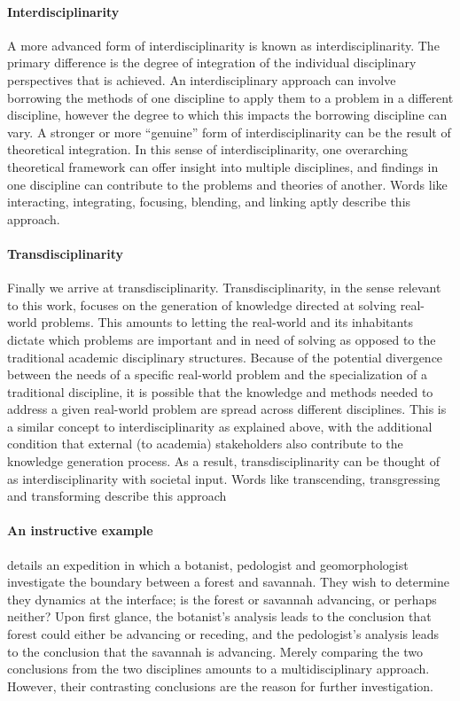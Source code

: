 \documentclass[a4paper]{article}
\begin{document}
\paragraph{Interdisciplinarity}

A more advanced form of interdisciplinarity is known as interdisciplinarity.
The primary difference is the degree of integration of the individual
disciplinary perspectives that is achieved. An interdisciplinary approach can
involve borrowing the methods of one discipline to apply them to a problem in
a different discipline, however the degree to which this impacts the borrowing
discipline can vary. A stronger or more ``genuine'' form of
interdisciplinarity can be the result of theoretical integration. In this
sense of interdisciplinarity, one overarching theoretical framework can offer
insight into multiple disciplines, and findings in one discipline can
contribute to the problems and theories of another. Words like interacting,
integrating, focusing, blending, and linking aptly describe this approach.

\paragraph{Transdisciplinarity}

Finally we arrive at transdisciplinarity. Transdisciplinarity, in the sense
relevant to this work, focuses on the generation of knowledge directed at
solving real-world problems. This amounts to letting the real-world and its
inhabitants dictate which problems are important and in need of solving as
opposed to the traditional academic disciplinary structures. Because of the
potential divergence between the needs of a specific real-world problem and
the specialization of a traditional discipline, it is possible that the
knowledge and methods needed to address a given real-world problem are spread
across different disciplines. This is a similar concept to
interdisciplinarity as explained above, with the additional condition that
external (to academia) stakeholders also contribute to the knowledge
generation process. As a result, transdisciplinarity can be thought of as
interdisciplinarity with societal input. Words like transcending,
transgressing and transforming describe this approach

\paragraph{An instructive example}

\cite{latour1999circulating} details an expedition in which a botanist,
pedologist and geomorphologist investigate the boundary between a forest and
savannah. They wish to determine they dynamics at the interface; is the forest
or savannah advancing, or perhaps neither? Upon first glance, the botanist's
analysis leads to the conclusion that forest could either be advancing or
receding, and the pedologist's analysis leads to the conclusion that the
savannah is advancing. Merely comparing the two conclusions from the two
disciplines amounts to a multidisciplinary approach. However, their
contrasting conclusions are the reason for further investigation.
\end{document}
